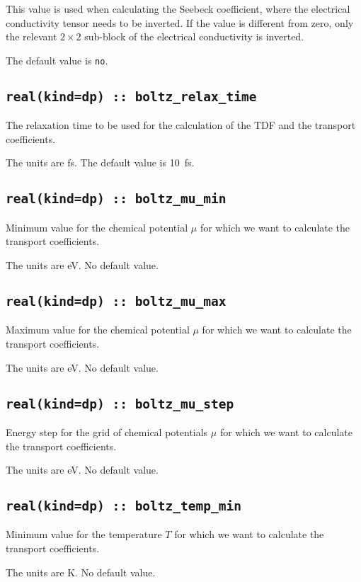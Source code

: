 This value is used when calculating the Seebeck coefficient, where the electrical conductivity tensor needs to be inverted. If the value is different from zero, only the relevant $2\times 2$ sub-block of the electrical conductivity is inverted.

The default value is \texttt{no}.

\subsection[boltz\_relax\_time]{\tt real(kind=dp) :: boltz\_relax\_time}
The relaxation time to be used for the calculation of the TDF and the transport coefficients.

The units are fs.
The default value is 10~fs.

\subsection[boltz\_mu\_min]{\tt real(kind=dp) :: boltz\_mu\_min}
Minimum value for the chemical potential $\mu$ for which we want to calculate the transport coefficients.

The units are eV.
No default value.

\subsection[boltz\_mu\_max]{\tt real(kind=dp) :: boltz\_mu\_max}
Maximum value for the chemical potential $\mu$ for which we want to calculate the transport coefficients.

The units are eV.
No default value.

\subsection[boltz\_mu\_step]{\tt real(kind=dp) :: boltz\_mu\_step}
Energy step for the grid of chemical potentials $\mu$ for which we want to calculate the transport coefficients.

The units are eV.
No default value.

\subsection[boltz\_temp\_min]{\tt real(kind=dp) :: boltz\_temp\_min}
Minimum value for the temperature $T$ for which we want to calculate the transport coefficients.

The units are K.
No default value.

